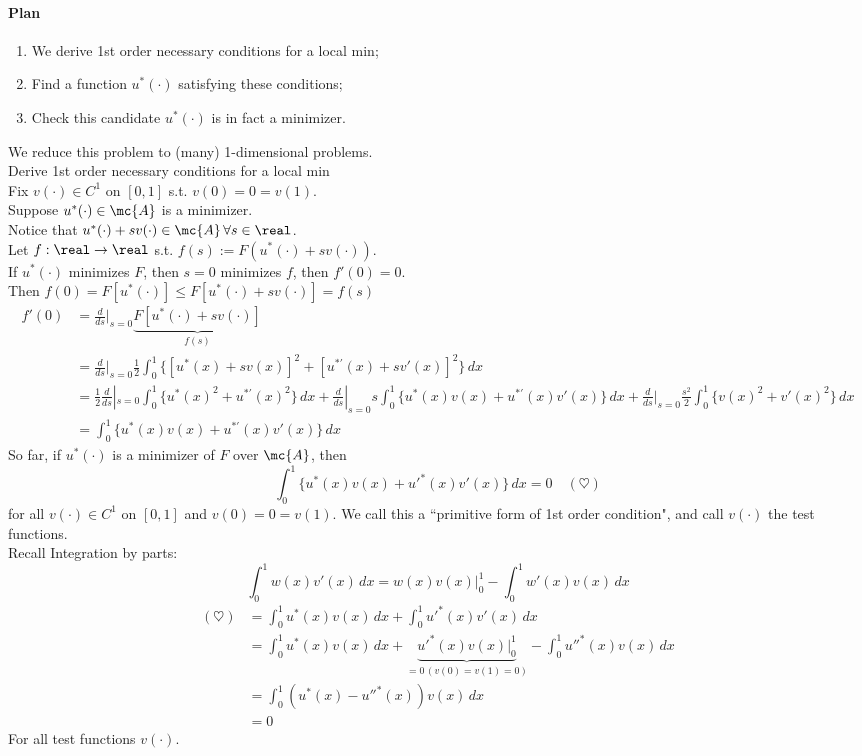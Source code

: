 \documentclass[11pt]{article}
\begin{document}
\paragraph{Plan}
\begin{enumerate}
	\item We derive 1st order necessary conditions for a local min;
	\item Find a function $u^*(\cdot)$ satisfying these conditions;
	\item Check this candidate $u^*(\cdot)$ is in fact a minimizer.
\end{enumerate}
We reduce this problem to (many) 1-dimensional problems. \\
 Derive 1st order necessary conditions for a local min \\
Fix $v(\cdot) \in C^1$ on $[0,1]$ s.t. $v(0) = 0 = v(1)$. \\
Suppose $u^*(\cdot) \in \mc{A}$ is a minimizer. \\
Notice that $u^*(\cdot) + sv(\cdot) \in \mc{A}\, \forall s \in \real$. \\
Let $f: \real \rightarrow \real$ s.t. $f(s) := F(u^*(\cdot) + sv(\cdot))$. \\
If $u^*(\cdot)$ minimizes $F$, then $s=0$ minimizes $f$, then $f'(0) = 0$. \\
Then $f(0) = F[u^*(\cdot)] \leq F[u^*(\cdot) + sv(\cdot)] = f(s)$ \\
\begin{align}
	f'(0) &= \frac{d}{ds}|_{s=0} \underbrace{F[u^*(\cdot) + sv(\cdot)]}_{f(s)} \\
	&= \frac{d}{ds}|_{s=0} \frac{1}{2} \int_0^1 \{ [u^*(x) + sv(x)]^2 + [u^{*'}(x) + sv'(x)]^2\} \, dx \\
	&= \frac{1}{2}\frac{d}{ds}|_{s=0} \int_0^1 \{ u^*(x)^2 + u^{*'}(x)^2\} \, dx + \frac{d}{ds}|_{s=0} s \int_0^1 \{u^*(x)v(x) + u^{*'}(x)v'(x)\} \, dx + \frac{d}{ds}|_{s=0} \frac{s^2}{2} \int_0^1 \{v(x)^2 + v'(x)^2\} \, dx \\
	&= \int_0^1 \{u^*(x)v(x) + u^{*'}(x)v'(x)\} \, dx
\end{align}
So far, if $u^*(\cdot)$ is a minimizer of $F$ over $\mc{A}$, then
$$\int_0^1 \{u^*(x)v(x) + u'^{*}(x)v'(x)\} \, dx = 0 \quad (\heartsuit)$$
for all $v(\cdot) \in C^1$ on $[0,1]$ and $v(0) = 0 = v(1)$.
We call this a ``primitive form of 1st order condition", and call $v(\cdot)$ the test functions. \\
Recall Integration by parts:
$$\int_0^1 w(x)v'(x) \, dx = w(x)v(x)|_0^1 - \int_0^1 w'(x)v(x) \, dx$$
\begin{align}
	(\heartsuit) &= \int_0^1 u^*(x) v(x) \, dx + \int_0^1 u'^{*}(x) v'(x) \, dx \\
	&=  \int_0^1 u^*(x) v(x) \, dx + \underbrace{u'^{*}(x)v(x)|_0^1}_{=0 \, (v(0) = v(1) = 0)} - \int_0^1 u''^{*}(x)v(x) \, dx \\
	&= \int_0^1 \left(u^*(x) - u''^{*}(x)\right) v(x) \, dx \\
	&= 0
\end{align}
For all test functions $v(\cdot)$.\\
\end{document}
